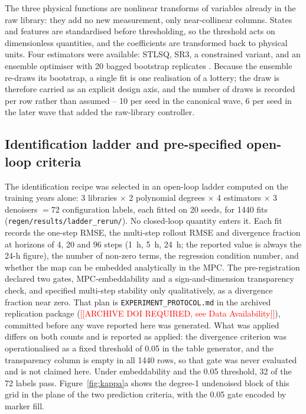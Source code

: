 The three physical functions are nonlinear transforms of variables already in the raw
library: they add no new measurement, only near-collinear columns. States and features
are standardised before thresholding, so the threshold acts on dimensionless quantities,
and the coefficients are transformed back to physical units. Four estimators were
available: STLSQ, SR3, a constrained variant, and an ensemble optimiser with 20 bagged
bootstrap replicates \cite{fasel2022}. Because the ensemble re-draws its bootstrap, a
single fit is one realisation of a lottery; the draw is therefore carried as an explicit
design axis, and the number of draws is recorded per row rather than assumed -- 10 per
seed in the canonical wave, 6 per seed in the later wave that added the raw-library
controller.

\subsection{Identification ladder and pre-specified open-loop criteria}
\label{sec:ladder}

The identification recipe was selected in an open-loop ladder computed on the training
years alone: 3 libraries $\times$ 2 polynomial degrees $\times$ 4 estimators $\times$
3 denoisers $=72$ configuration labels, each fitted on 20 seeds, for 1440 fits
(\texttt{regen/results/ladder\_rerun/}). No closed-loop quantity enters it. Each fit
records the one-step RMSE, the multi-step rollout RMSE and divergence fraction at
horizons of 4, 20 and 96 steps (1~h, 5~h, 24~h; the reported value is always the 24-h
figure), the number of non-zero terms, the regression condition number, and whether the
map can be embedded analytically in the MPC. The pre-registration declared two gates,
MPC-embeddability and a sign-and-dimension transparency check, and specified multi-step
stability only qualitatively, as a divergence fraction near zero. That plan is
\texttt{EXPERIMENT\_PROTOCOL.md} in the archived replication package
(\textcolor{red}{[[ARCHIVE DOI REQUIRED, see Data Availability]]}), committed before
any wave reported here was generated. What was applied differs
on both counts and is reported as applied: the divergence criterion was operationalised as
a fixed threshold of 0.05 in the table generator, and the transparency column is empty in
all 1440 rows, so that gate was never evaluated and is not claimed here. Under
embeddability and the 0.05 threshold, 32 of the 72 labels pass.
Figure~\ref{fig:kappa}a shows the degree-1 undenoised block of this grid in the plane of
the two prediction criteria, with the 0.05 gate encoded by marker fill.

